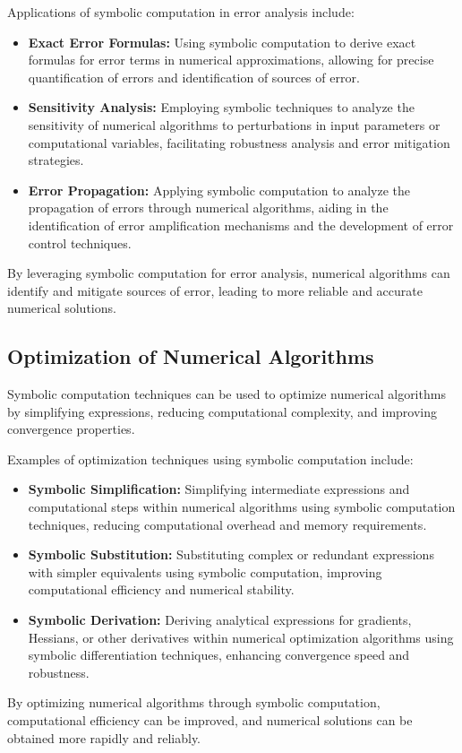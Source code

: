 Applications of symbolic computation in error analysis include:
%
\begin{itemize}
  \setlength{\itemsep}{0.0em}
  \item \textbf{Exact Error Formulas:} Using symbolic computation to derive exact formulas for error terms in numerical approximations, allowing for precise quantification of errors and identification of sources of error.
  \item \textbf{Sensitivity Analysis:} Employing symbolic techniques to analyze the sensitivity of numerical algorithms to perturbations in input parameters or computational variables, facilitating robustness analysis and error mitigation strategies.
  \item \textbf{Error Propagation:} Applying symbolic computation to analyze the propagation of errors through numerical algorithms, aiding in the identification of error amplification mechanisms and the development of error control techniques.
\end{itemize}
%
By leveraging symbolic computation for error analysis, numerical algorithms can identify and mitigate sources of error, leading to more reliable and accurate numerical solutions.

\subsection{Optimization of Numerical Algorithms}

Symbolic computation techniques can be used to optimize numerical algorithms by simplifying expressions, reducing computational complexity, and improving convergence properties.

Examples of optimization techniques using symbolic computation include:
%
\begin{itemize}
  \setlength{\itemsep}{0.0em}
  \item \textbf{Symbolic Simplification:} Simplifying intermediate expressions and computational steps within numerical algorithms using symbolic computation techniques, reducing computational overhead and memory requirements.
  \item \textbf{Symbolic Substitution:} Substituting complex or redundant expressions with simpler equivalents using symbolic computation, improving computational efficiency and numerical stability.
  \item \textbf{Symbolic Derivation:} Deriving analytical expressions for gradients, Hessians, or other derivatives within numerical optimization algorithms using symbolic differentiation techniques, enhancing convergence speed and robustness.
\end{itemize}
%
By optimizing numerical algorithms through symbolic computation, computational efficiency can be improved, and numerical solutions can be obtained more rapidly and reliably.

